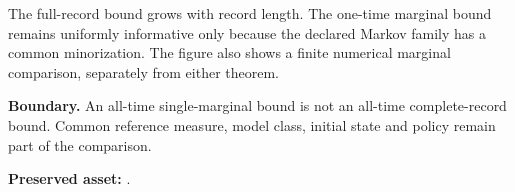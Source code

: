 \documentclass[11pt,letterpaper]{article}
\begin{document}
The full-record bound grows with record length. The one-time marginal
bound remains uniformly informative only because the declared Markov
family has a common minorization. The figure also shows a finite
numerical marginal comparison, separately from either theorem.

\textbf{Boundary.} An all-time single-marginal bound is not an all-time
complete-record bound. Common reference measure, model class, initial
state and policy remain part of the comparison.

\textbf{Preserved asset:} .
\end{document}
